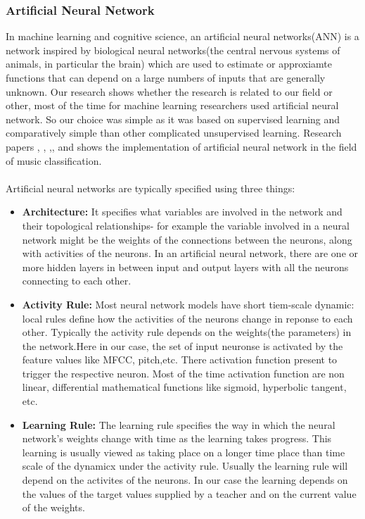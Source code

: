{\subsubsection{Artificial Neural Network}
In machine learning and cognitive science, an artificial neural networks(ANN) is a network inspired by biological neural networks(the central nervous systems of 
animals, in particular the brain) which are used to estimate or approxiamte functions that can depend on a large numbers of inputs that are generally unknown.
Our research shows whether the research is related to our field or other, most of the time for machine learning researchers used artificial neural network.
So our choice was simple as it was based on supervised learning and comparatively simple than other complicated unsupervised learning.
Research papers \cite{Koerich2013}, \cite{Neumayer2004}, ,\cite{Anglade2010}, \cite{Haggblade2011} and \cite{Kour2015} shows the implementation of artificial neural network in the field of
music classification.\\
\\
Artificial neural networks are typically specified using three things:
\begin{itemize}
        \item \textbf{Architecture:} 
                It specifies what variables are involved in the network and their topological relationships- for example the variable involved
                in a neural network might be the weights of the connections between the neurons, along with activities of the neurons. In an artificial
                neural network, there are one or more hidden layers in between input and output layers with all the neurons connecting to each other.
        \item \textbf{Activity Rule:}
                Most neural network models have short tiem-scale dynamic: local rules define how the activities of the neurons change in reponse to each other.
                Typically the activity rule depends on the weights(the parameters) in the network.Here in our case, the set of input neuronse
                is activated by the feature values like MFCC, pitch,etc. There activation function present to trigger the respective neuron. Most of the time
                activation function are non linear, differential mathematical functions like sigmoid, hyperbolic tangent, etc.
        \item \textbf{Learning Rule:}
                The learning rule specifies the way in which the neural network's weights change with time as the learning takes progress. This learning is usually viewed as 
                taking place on a longer time place than time scale of the dynamicx under the activity rule. Usually the learning rule will depend on the activites of the 
                neurons. In our case the learning depends on the values of the target values supplied by a teacher and on the current value of the weights.
\end{itemize}

}
